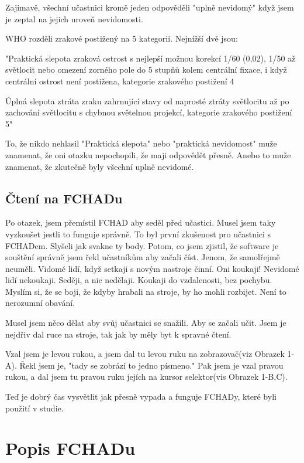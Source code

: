 Zajimavě, všechní učastnici kromě jeden odpověděli "uplně nevidomý" když jsem je zeptal na jejich uroveň nevidomosti.

WHO rozděli zrakové postižený na 5 kategorii. Nejnížší dvě jsou:

"Praktická slepota
zraková ostrost s nejlepší možnou korekcí 1/60 (0,02), 1/50 až světlocit nebo omezení zorného pole do 5 stupňů kolem centrální fixace, i když centrální ostrost není postižena, kategorie zrakového postižení 4

Úplná slepota
ztráta zraku zahrnující stavy od naprosté ztráty světlocitu až po zachování světlocitu s chybnou světelnou projekcí, kategorie zrakového postižení 5"\citep{sonsklasifikace}

To, že nikdo nehlasil "Praktická slepota" nebo "praktická nevidomost" muže znamenat, že oni otazku nepochopili, že maji odpovědět přesně.  Anebo to muže znamenat, že zkutečně byly všechní uplně nevidomé.

\subsection{Čtení na FCHADu}

Po otazek, jsem přemístil FCHAD aby seděl před učastici.  Musel jsem taky vyzkoušet jestli to funguje správně. To byl první zkušenost pro učastnici s FCHADem.  Slyšeli jak svakne ty body.  Potom, co jsem zjistil, že software je souštění správně jsem řekl učastníkům aby začali číst.  Jenom, že samolřejmě neuměli.  Vidomé lidí, když setkaji s novým nastroje činní. Oni koukaji!  Nevidomé lidí nekoukaji.  Seději, a nic nedělaji.  Koukaji do vzdalenosti, bez pochybu.  Myslím si, že se boji, že kdyby hrabali na stroje, by ho mohli rozbijet.  Není to nerozumní obavání.

Musel jsem něco dělat aby svůj učastnici se snažili. Aby se začali učit.  Jsem je nejdřiv dal ruce na stroje, tak jak by měly byt k spravné čtení.

Vzal jsem je levou rukou, a jsem dal tu levou ruku na zobrazovač(viz Obrazek 1-A). Řekl jsem je, "tady se zobrází to jedno písmeno."  Pak jsem je vzal pravou rukou, a dal jsem tu pravou ruku jejích na kursor selektor(vis Obrazek 1-B,C).

Teď je dobrý čas vysvětlit jak přesně vypada a funguje FCHADy, které byli použití v studie.

\section{Popis FCHADu}


